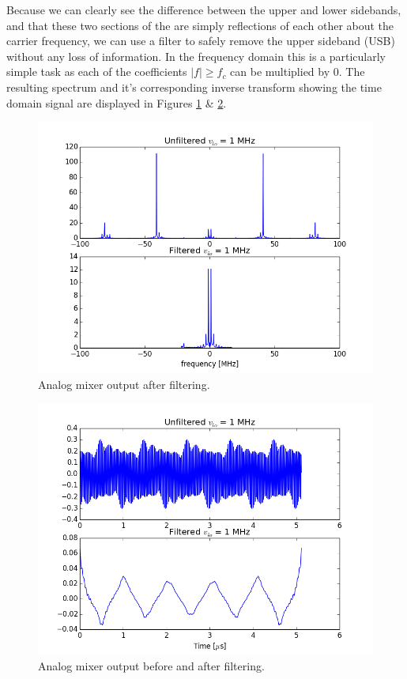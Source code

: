 \documentclass{article}
\begin{document}
  Because we can clearly see the difference between the upper and lower sidebands, and that these two sections of the are simply reflections of each other about the carrier frequency, we can use a filter to safely remove the upper sideband (USB) without any loss of information. In the frequency domain this is a particularly simple task as each of the coefficients $|f| \ge f_c$ can be multiplied by 0. The resulting spectrum and it's corresponding inverse transform showing the time domain signal are displayed in Figures \ref{fig:analog_filtered_f} \& \ref{fig:analog_filtered_t}.  
  
\begin{figure}[h!]
\centering
\includegraphics[scale=0.7]{analog_filtered_f.png}
\caption{Analog mixer output after filtering.}
\label{fig:analog_filtered_f}
\end{figure}

\begin{figure}[h!]
\centering
\includegraphics[scale=0.7]{analog_filtered_t.png}
\caption{Analog mixer output before and after filtering.}
\label{fig:analog_filtered_t}
\end{figure}
\end{document}
